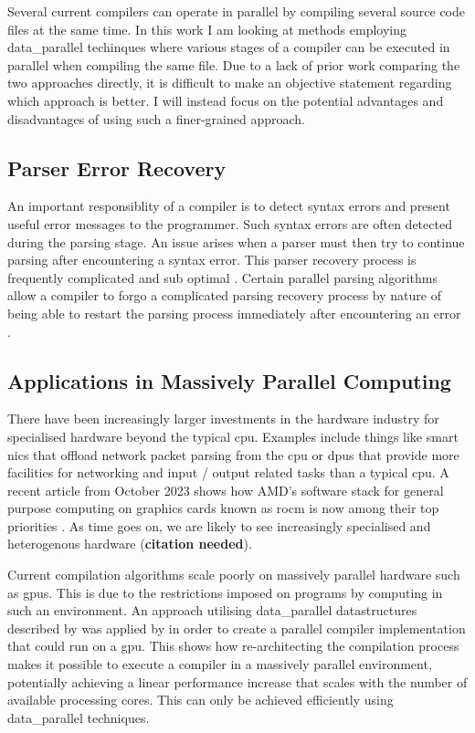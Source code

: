 Several current compilers can operate in parallel by compiling several source
code files at the same time. In this work I am looking at methods employing
\gls{data_parallel} techinques where various stages of a compiler can be executed in
parallel when compiling the same file. Due to a lack of prior work comparing
the two approaches directly, it is difficult to make an objective statement
regarding which approach is better. I will instead focus on the potential
advantages and disadvantages of using such a finer-grained approach.

\subsection{Parser Error Recovery}

An important responsiblity of a compiler is to detect syntax errors and
present useful error messages to the programmer. Such syntax errors are often
detected during the parsing stage. An issue arises when a parser must then try
to continue parsing after encountering a syntax error. This parser recovery
process is frequently complicated and sub optimal \citep{medeiros_syntax_2018,
hutchison_pika_2020}. Certain parallel parsing algorithms allow a compiler
to forgo a complicated parsing recovery process by nature of being able
to restart the parsing process immediately after encountering an error
\citep{clarke_error_1993}.

\subsection{Applications in Massively Parallel Computing}

There have been increasingly larger investments in the hardware industry for
specialised hardware beyond the typical \ac{cpu}. Examples include things like smart
\ac{nic}s that offload network packet parsing from the \ac{cpu} or \ac{dpu}s that provide
more facilities for networking and input / output related tasks than a typical
\ac{cpu}. A recent article from October 2023 shows how AMD’s software stack for
general purpose computing on graphics cards known as \ac{rocm} is now among their
top priorities \citep{ward-foxton_rocm_2023}. As time goes on, we are likely
to see increasingly specialised and heterogenous hardware (\textbf{citation
needed}).

Current compilation algorithms scale poorly on massively parallel hardware
such as \ac{gpu}s. This is due to the restrictions imposed on programs by
computing in such an environment. An approach utilising \gls{data_parallel}
datastructures described by \cite{hillis_data_1986} was applied by
\cite{voetter_compilation_2022} in order to create a parallel compiler
implementation that could run on a \ac{gpu}. This shows how  re-architecting
the compilation process makes it possible to execute a compiler in a massively
parallel environment, potentially achieving a linear performance increase that
scales with the number of available processing cores. This can only be achieved
efficiently using \gls{data_parallel} techniques.

